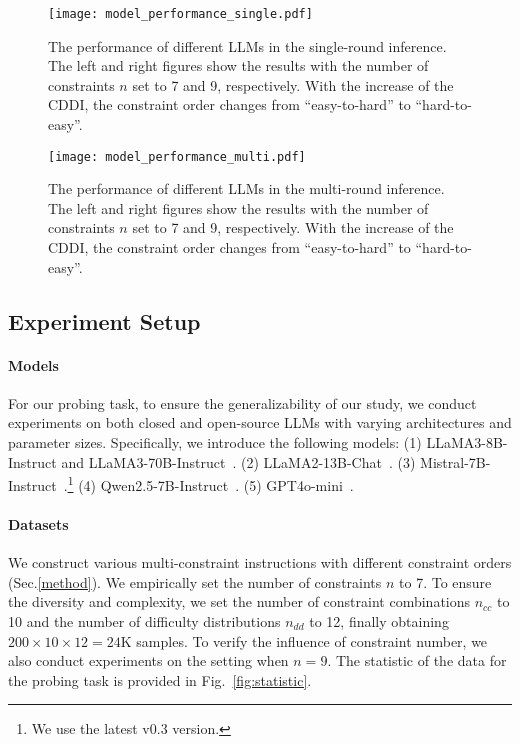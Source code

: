 \begin{figure*}[t] 
    \centering
        \texttt{[image: model\_performance\_single.pdf]}
    \caption{The performance of different LLMs in the single-round inference. The left and right figures show the results with the number of constraints $n$ set to 7 and 9, respectively. With the increase of the CDDI, the constraint order changes from ``easy-to-hard'' to ``hard-to-easy''.}
    \label{fig:7cons}
\end{figure*}

\begin{figure*}[t] 
    \centering
        \texttt{[image: model\_performance\_multi.pdf]}
    \caption{The performance of different LLMs in the multi-round inference. The left and right figures show the results with the number of constraints $n$ set to 7 and 9, respectively. With the increase of the CDDI, the constraint order changes from ``easy-to-hard'' to ``hard-to-easy''.}
    \label{fig:multi_7cons}
\end{figure*}



\subsection{Experiment Setup}
\paragraph*{Models} For our probing task, to ensure the generalizability of our study, we conduct experiments on both closed and open-source LLMs with varying architectures and parameter sizes. Specifically, we introduce the following models: (1) LLaMA3-8B-Instruct and LLaMA3-70B-Instruct~\cite{dubey2024llama}. (2) LLaMA2-13B-Chat~\cite{touvron2023llama}. (3) Mistral-7B-Instruct~\cite{jiang2023mistral}.\footnote{We use the latest v0.3 version.} (4) Qwen2.5-7B-Instruct~\cite{yang2024qwen2}. (5) GPT4o-mini~\cite{achiam2023gpt}.


\paragraph*{Datasets} We construct various multi-constraint instructions with different constraint orders (Sec.\ref{method}). We empirically set the number of constraints ${n}$ to 7. To ensure the diversity and complexity, we set the number of constraint combinations $n_{cc}$ to 10 and the number of difficulty distributions $n_{dd}$ to 12, finally obtaining $200\times10\times12=24\text{K}$ samples. To verify the influence of constraint number, we also conduct experiments on the setting when ${n=9}$. The statistic of the data for the probing task is provided in Fig.~\ref{fig:statistic}.







